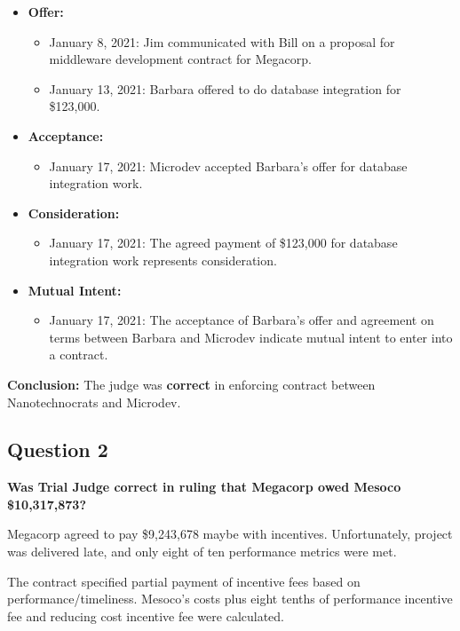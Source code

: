 \documentclass[12pt]{article}
\begin{document}
\begin{itemize}[label=$\bullet$]
    \item \textbf{Offer:}
    \begin{itemize}
        \item January 8, 2021: Jim communicated with Bill on a proposal for middleware development contract for Megacorp.
        \item January 13, 2021: Barbara offered to do database integration for \$123,000.
    \end{itemize}
    \item \textbf{Acceptance:}
    \begin{itemize}
        \item January 17, 2021: Microdev accepted Barbara's offer for database integration work.
    \end{itemize}
    \item \textbf{Consideration:}
    \begin{itemize}
        \item January 17, 2021: The agreed payment of \$123,000 for database integration work represents consideration.
    \end{itemize}
    \item \textbf{Mutual Intent:}
    \begin{itemize}
        \item January 17, 2021: The acceptance of Barbara's offer and agreement on terms between Barbara and Microdev indicate mutual intent to enter into a contract.
    \end{itemize}
\end{itemize}

\textbf{Conclusion:} The judge was \textbf{correct} in enforcing contract between Nanotechnocrats and Microdev.

\subsection*{Question 2}
\textbf{Was Trial Judge correct in ruling that Megacorp owed Mesoco \$10,317,873?}


Megacorp agreed to pay \$9,243,678 maybe with incentives.
Unfortunately, project was delivered late, and only eight of ten performance metrics were met.

The contract specified partial payment of incentive fees based on performance/timeliness.
Mesoco's costs plus eight tenths of performance incentive fee and reducing cost incentive fee were calculated.
\end{document}
